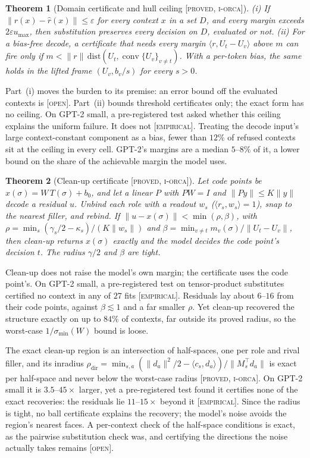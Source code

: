 \documentclass[11pt]{article}
\theoremstyle{definition}
\theoremstyle{plain}
\newtheorem{theorem}{Theorem}[section]
\theoremstyle{remark}
\newcommand{\proved}{\textsc{[proved, i-orca]}}
\newcommand{\empirical}{\textsc{[empirical]}}
\newcommand{\open}{\textsc{[open]}}
\begin{document}
\begin{theorem}[Domain certificate and hull ceiling \proved{}]\label{thm:subst-domain}
(i) If $\|r(x)-\hat r(x)\|\le\varepsilon$ for every context $x$ in a set $D$, and every margin exceeds
$2\varepsilon u_{\max}$, then substitution preserves every decision on $D$, evaluated or not. (ii) For a bias-free
decode, a certificate that needs every margin $\langle r,U_t-U_v\rangle$ above $m$ can fire only if
$m<\|r\|\,\mathrm{dist}(U_t,\operatorname{conv}\{U_v\}_{v\ne t})$. With a per-token bias, the same holds in the
lifted frame $(U_v,b_v/s)$ for every $s>0$.
\end{theorem}

\noindent Part~(i) moves the burden to its premise: an error bound off the evaluated contexts is \open{}. Part~(ii)
bounds threshold certificates only; the exact form has no ceiling. On GPT-2 small, a pre-registered test asked
whether this ceiling explains the uniform failure. It does not \empirical{}. Treating the decode input's large
context-constant component as a bias, fewer than $12\%$ of refused contexts sit at the ceiling in every cell. GPT-2's
margins are a median $5$--$8\%$ of it, a lower bound on the share of the achievable margin the model uses.

\begin{theorem}[Clean-up certificate \proved{}]\label{thm:cleanup}
Let code points be $x(\sigma)=W\,T(\sigma)+b_0$, and let a linear $P$ with $PW=I$ and $\|Py\|\le K\|y\|$ decode a
residual $u$. Unbind each role with a readout $w_s$ ($\langle r_s,w_s\rangle=1$), snap to the nearest filler, and
rebind. If $\|u-x(\sigma)\|<\min(\rho,\beta)$, with
$\rho=\min_s(\gamma_s/2-\kappa_s)/(K\|w_s\|)$ and $\beta=\min_{v\ne t}m_v(\sigma)/\|U_t-U_v\|$, then clean-up
returns $x(\sigma)$ exactly and the model decides the code point's decision $t$. The radius $\gamma/2$ and $\beta$
are tight.
\end{theorem}

\noindent Clean-up does not raise the model's own margin; the certificate uses the code point's. On GPT-2 small,
a pre-registered test on tensor-product substitutes certified no context in any of $27$ fits \empirical{}. Residuals
lay about $6$--$16$ from their code points, against $\beta\lesssim1$ and a far smaller $\rho$. Yet clean-up
recovered the structure exactly on up to $84\%$ of contexts, far outside its proved radius, so the worst-case
$1/\sigma_{\min}(W)$ bound is loose.

The exact clean-up region is an intersection of half-spaces, one per role and rival filler, and its inradius
$\rho_{\mathrm{dir}}=\min_{s,a}(\|d_a\|^2/2-\langle c_s,d_a\rangle)/\|M_s^{\top}d_a\|$ is exact per half-space and
never below the worst-case radius \proved{}. On GPT-2 small it is $3.5$--$45\times$ larger, yet a pre-registered
test found it certifies none of the exact recoveries: the residuals lie $11$--$15\times$ beyond it \empirical{}. Since
the radius is tight, no ball certificate explains the recovery; the model's noise avoids the region's nearest faces. A
per-context check of the half-space conditions is exact, as the pairwise substitution check was, and certifying the
directions the noise actually takes remains \open{}.
\end{document}
